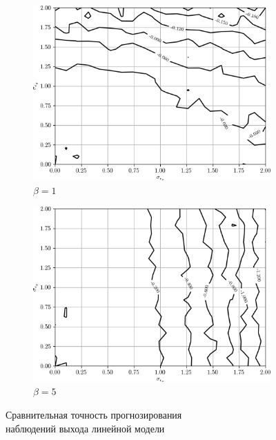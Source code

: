 \begin{figure}[p]
  \begin{subfigure}[b]{\linewidth}
    \centering
    \includegraphics[width=135mm]{fig/linear/predict/beta-1_predict-measured.png}
    \caption{\( \beta = 1 \)}
  \end{subfigure}

  \vspace{2\baselineskip}
  \begin{subfigure}[b]{\linewidth}
    \centering
    \includegraphics[width=135mm]{fig/linear/predict/beta-5_predict-measured.png}
    \caption{\( \beta = 5 \)}
  \end{subfigure}

  \vspace{\baselineskip}
  \caption{%
    Сравнительная точность прогнозирования \\
    наблюдений выхода линейной модели
  }\label{fig:comparison_linear_predict}
\end{figure}

